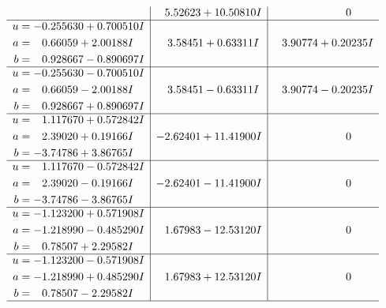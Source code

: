 \documentclass[1p]{elsarticle_modified}
\theoremstyle{definition}
\begin{document}
$$\begin{array}{c|c|c}
 & \phantom{-}5.52623 + 10.50810 I & \phantom{-0.000000 } 0 \\ \hline\begin{aligned}
u &= -0.255630 + 0.700510 I \\
a &= \phantom{-}0.66059 + 2.00188 I \\
b &= \phantom{-}0.928667 - 0.890697 I\end{aligned}
 & \phantom{-}3.58451 + 0.63311 I & \phantom{-}3.90774 + 0.20235 I \\ \hline\begin{aligned}
u &= -0.255630 - 0.700510 I \\
a &= \phantom{-}0.66059 - 2.00188 I \\
b &= \phantom{-}0.928667 + 0.890697 I\end{aligned}
 & \phantom{-}3.58451 - 0.63311 I & \phantom{-}3.90774 - 0.20235 I \\ \hline\begin{aligned}
u &= \phantom{-}1.117670 + 0.572842 I \\
a &= \phantom{-}2.39020 + 0.19166 I \\
b &= -3.74786 + 3.86765 I\end{aligned}
 & -2.62401 + 11.41900 I & \phantom{-0.000000 } 0 \\ \hline\begin{aligned}
u &= \phantom{-}1.117670 - 0.572842 I \\
a &= \phantom{-}2.39020 - 0.19166 I \\
b &= -3.74786 - 3.86765 I\end{aligned}
 & -2.62401 - 11.41900 I & \phantom{-0.000000 } 0 \\ \hline\begin{aligned}
u &= -1.123200 + 0.571908 I \\
a &= -1.218990 - 0.485290 I \\
b &= \phantom{-}0.78507 + 2.29582 I\end{aligned}
 & \phantom{-}1.67983 - 12.53120 I & \phantom{-0.000000 } 0 \\ \hline\begin{aligned}
u &= -1.123200 - 0.571908 I \\
a &= -1.218990 + 0.485290 I \\
b &= \phantom{-}0.78507 - 2.29582 I\end{aligned}
 & \phantom{-}1.67983 + 12.53120 I & \phantom{-0.000000 } 0\\
 \hline 
 \end{array}$$\newpage$$\begin{array}{c|c|c}  

\end{array}$$
\end{document}
